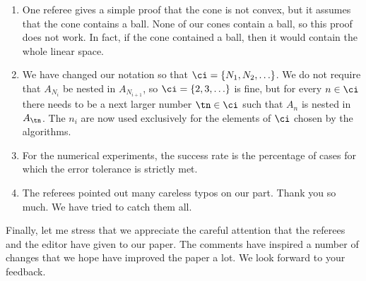 \documentclass[11pt]{article}
\begin{document}
\begin{enumerate}
\item One referee gives a simple proof that the cone is not convex, but it assumes that the cone contains a ball.  None of our cones contain a ball, so this proof does not work.  In fact, if the cone contained a ball, then it would contain the whole linear space.

\item We have changed our notation so that $\ci=\{N_1, N_2, \ldots \}$.  We do not require that $A_{N_i}$ be nested in $A_{N_{i+1}}$, so $\ci=\{2,3, \ldots\}$ is fine, but for every $n \in \ci$ there needs to be a next larger number $\tn \in \ci$ such that $A_n$ is nested in $A_{\tn}$.  The $n_i$ are now used exclusively for the elements of $\ci$ chosen by the algorithms.

\item For the numerical experiments, the success rate is the percentage of cases for which the error tolerance is strictly met.  

\item The referees pointed out many careless typos on our part.  Thank you so much.  We have tried to catch them all.

\end{enumerate}

Finally, let me stress that we appreciate the careful attention that the referees and the editor have given to our paper.  The comments have inspired a number of changes that we hope have improved the paper a lot.  We look forward to your feedback.



\end{document}

